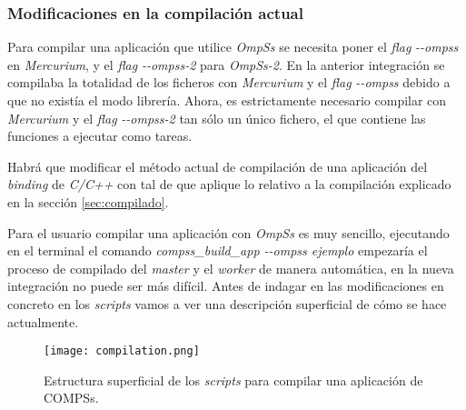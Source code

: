 \subsubsection{Modificaciones en la compilación actual}

Para compilar una aplicación que utilice \textit{OmpSs} se necesita poner el \textit{flag} \textit{-{}-ompss} en \textit{Mercurium}, y el \textit{flag} \textit{-{}-ompss-2} para \textit{OmpSs-2}. En la anterior integración se compilaba la totalidad de los ficheros con \textit{Mercurium} y el \textit{flag} \textit{-{}-ompss} debido a que no existía el modo librería. Ahora, es estrictamente necesario compilar con \textit{Mercurium} y el \textit{flag} \textit{-{}-ompss-2} tan sólo un único fichero, el que contiene las funciones a ejecutar como tareas. 
\par\bigskip
Habrá que modificar el método actual de compilación de una aplicación del \textit{binding} de \textit{C/C++} con tal de que aplique lo relativo a la compilación explicado en la sección \ref{sec:compilado}.
\par\bigskip

Para el usuario compilar una aplicación con \textit{OmpSs} es muy sencillo, ejecutando en el terminal el comando \textit{compss\_build\_app -{}-ompss ejemplo} empezaría el proceso de compilado del \textit{master} y el \textit{worker} de manera automática, en la nueva integración no puede ser más difícil. Antes de indagar en las modificaciones en concreto en los \textit{scripts} vamos a ver una descripción superficial de cómo se hace actualmente.

\begin{figure}[H]
    \centering 
    \caption{Estructura superficial de los \textit{scripts} para compilar una aplicación de COMPSs.}
    \texttt{[image: compilation.png]}
    \label{fig:compilado}
\end{figure}

